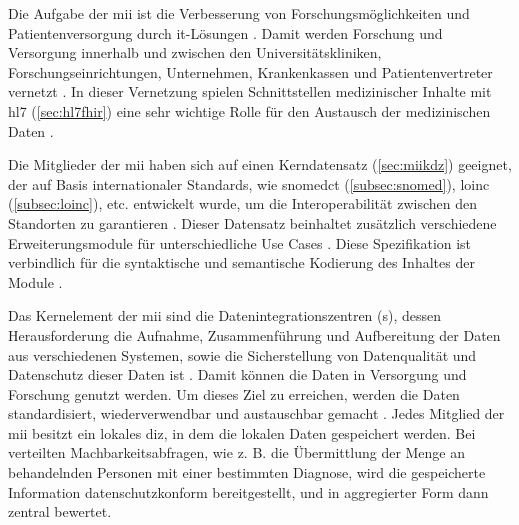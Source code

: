 Die Aufgabe der \ac{mii} ist die Verbesserung von Forschungsmöglichkeiten und Patientenversorgung durch \acs{it}-Lösungen \cite{mii}. Damit werden Forschung und Versorgung innerhalb und zwischen den Universitätskliniken, Forschungseinrichtungen, Unternehmen, Krankenkassen und Patientenvertreter vernetzt \cite{telemedizin, mii}. In dieser Vernetzung spielen Schnittstellen medizinischer Inhalte mit \acs{hl7} (\ref{sec:hl7fhir}) eine sehr wichtige Rolle für den Austausch der medizinischen Daten \cite{telemedizin}. 

Die Mitglieder der \ac{mii} haben sich auf einen Kerndatensatz (\ref{sec:miikdz}) geeignet, der auf Basis internationaler Standards, wie \ac{snomedct} (\ref{subsec:snomed}), \ac{loinc} (\ref{subsec:loinc}), etc. entwickelt wurde, um die Interoperabilität zwischen den Standorten zu garantieren \cite{telemedizin, miikdz}. Dieser Datensatz beinhaltet zusätzlich verschiedene Erweiterungsmodule für unterschiedliche Use Cases \cite{mii}. Diese Spezifikation ist verbindlich für die syntaktische und semantische Kodierung des Inhaltes der Module \cite{icukdz}.

Das Kernelement der \ac{mii} sind die Datenintegrationszentren (s), dessen Herausforderung die Aufnahme, Zusammenführung und Aufbereitung der Daten aus verschiedenen Systemen, sowie die Sicherstellung von Datenqualität und Datenschutz dieser Daten ist \cite{mii, diz}. Damit können die Daten in Versorgung und Forschung genutzt werden. Um dieses Ziel zu erreichen, werden die Daten standardisiert, wiederverwendbar und austauschbar gemacht \cite{diz}. Jedes Mitglied der \ac{mii} besitzt ein lokales \ac{diz}, in dem die lokalen Daten gespeichert werden. Bei verteilten Machbarkeitsabfragen, wie z. B. die Übermittlung der Menge an behandelnden Personen mit einer bestimmten Diagnose, wird die gespeicherte Information datenschutzkonform bereitgestellt, und in aggregierter Form dann zentral bewertet.